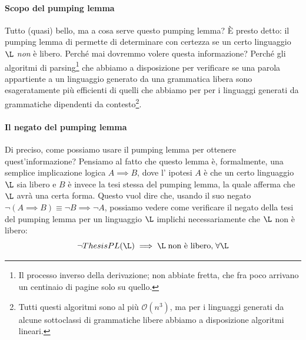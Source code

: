\documentclass[class=book, crop=false, oneside, 12pt]{standalone}
\begin{document}
  \paragraph{Scopo del pumping lemma}
  Tutto (quasi) bello, ma a cosa serve questo pumping lemma? È presto detto: il pumping lemma di permette di determinare con certezza se un certo linguaggio \(\L\) \emph{non} è libero. Perché mai dovremmo volere questa informazione? Perché gli algoritmi di parsing\footnote{Il processo inverso della derivazione; non abbiate fretta, che fra poco arrivano un centinaio di pagine solo su quello.} che abbiamo a disposizione per verificare se una parola appartiente a un linguaggio generato da una grammatica libera sono esageratamente più efficienti di quelli che abbiamo per per i linguaggi generati da grammatiche dipendenti da contesto\footnote{Tutti questi algoritmi sono al più \(\mathcal{O}(n^3)\), ma per i linguaggi generati da alcune sottoclassi di grammatiche libere abbiamo a disposizione algoritmi lineari.}.

  \paragraph{Il negato del pumping lemma}
  Di preciso, come possiamo usare il pumping lemma per ottenere quest'informazione? Pensiamo al fatto che questo lemma è, formalmente, una semplice implicazione logica \(A \implies B\), dove l' ipotesi \(A\) è che un certo linguaggio \(\L\) sia libero e \(B\) è invece la tesi stessa del pumping lemma, la quale afferma che \(\L\) avrà una certa forma. Questo vuol dire che, usando il suo negato \(\neg (A \implies B) \equiv \neg B \implies \neg A\), possiamo vedere come verificare il negato della tesi del pumping lemma per un linguaggio \(\L\) implichi necessariamente che \(\L\) non è libero:
  \begin{equation}
    \label{eq:pl-neg-abstract}
    \neg ThesisPL(\L) \implies \L\; \textrm{non è libero,}\; \forall \L
  \end{equation}
\end{document}
